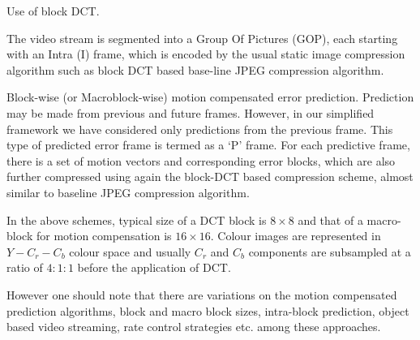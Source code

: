 \documentclass{doublecol-new}
\theoremstyle{TH}{
\newtheorem{lemma}{Lemma}[section]
\newtheorem{theorem}{Theorem}
\newtheorem{corrolary}{Corrolary}
\newtheorem{conjecture}[lemma]{Conjecture}
\newtheorem{proposition}[lemma]{Proposition}
\newtheorem{claim}[lemma]{Claim}
\newtheorem{stheorem}[lemma]{Wrong Theorem}
}
\theoremstyle{THrm}{
\newtheorem{definition}{Definition}[section]
\newtheorem{question}{Question}[section]
\newtheorem{remark}{Remark}[section]
\newtheorem{scheme}{Scheme}
}
\theoremstyle{THhit}{
\newtheorem{case}{Case}[section]
}
\begin{document}
\begin{BL}
\item Use of block DCT.

\item The video stream is segmented into a Group Of Pictures
(GOP), each
       starting with an Intra (I) frame, which is encoded by the usual static
       image compression algorithm such as block DCT based base-line JPEG
       compression algorithm.

\item Block-wise (or Macroblock-wise) motion compensated error
prediction.
       Prediction may be made from previous and future frames. However, in
       our simplified framework we have considered only predictions from the
       previous frame. This type of predicted error frame is termed as a `P' %
       frame. For each predictive frame, there is a set of motion vectors and
       corresponding error blocks, which are also further compressed using
  again the block-DCT based compression scheme, almost similar to baseline
       JPEG compression algorithm.

\item In the above schemes, typical size of a DCT block is $8
\times 8$ and that  of a macro-block for motion compensation is $16 \times 16$.
Colour images are represented in $Y-C_r-C_b$ colour space and usually $C_r$ and
$C_b$ components are subsampled at a ratio of $4:1:1$ before the application of
DCT.
\end{BL}
However one should note that there are  variations on the motion compensated
prediction algorithms, block and macro block sizes, intra-block prediction,
object based video streaming, rate control strategies etc. among these
approaches.

\enlargethispage{7pt}
\end{document}
